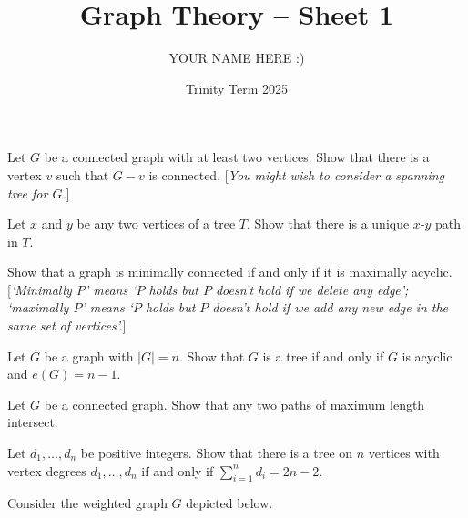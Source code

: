 \documentclass[answers]{exam}
\title{Graph Theory -- Sheet 1}
\author{YOUR NAME HERE :)}
\date{Trinity Term 2025}
\begin{document}
\maketitle
\begin{questions}

\question%
Let $G$ be a connected graph with at least two vertices. Show that there is a vertex $v$ such that $G-v$ is connected. [\emph{You might wish to consider a spanning tree for $G$.}]



\question%
Let $x$ and $y$ be any two vertices of a tree $T$. Show that there is a unique $x$-$y$ path in $T$.



\question%
Show that a graph is minimally connected if and only if it is maximally acyclic.
[\emph{`Minimally $P$' means `$P$ holds but $P$ doesn't hold if we delete any edge'; `maximally $P$' means `$P$ holds but $P$ doesn't hold if we add any new edge in the same set of vertices'.}]



\question%
Let $G$ be a graph with $|G|=n$. Show that $G$ is a tree if and only if $G$ is acyclic and $e(G)=n-1$.



\question%
Let $G$ be a connected graph. Show that any two paths of maximum length intersect.



\question%
Let $d_{1}, \ldots, d_{n}$ be positive integers. Show that there is a tree on $n$ vertices with vertex degrees $d_{1}, \ldots, d_{n}$ if and only if $\sum_{i=1}^{n} d_{i}=2 n-2$.



\question%
Consider the weighted graph $G$ depicted below.
\begin{center}
\end{center}
\end{questions}
\end{document}
